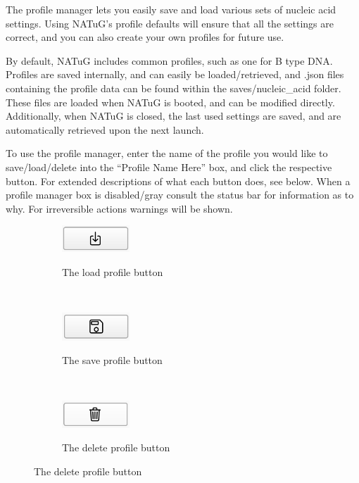 \documentclass[titlepage]{article}
\begin{document}
	The profile manager lets you easily save and load various sets of nucleic acid settings. Using NATuG’s profile defaults will ensure that all the settings are correct, and you can also create your own profiles for future use.
	
	By default, NATuG includes common profiles, such as one for B type DNA. Profiles are saved internally, and can easily be loaded/retrieved, and .json files containing the profile data can be found within the saves/nucleic\_acid folder. These files are loaded when NATuG is booted, and can be modified directly. Additionally, when NATuG is closed, the last used settings are saved, and are automatically retrieved upon the next launch.
	
	To use the profile manager, enter the name of the profile you would like to save/load/delete into the “Profile Name Here” box, and click the respective button. For extended descriptions of what each button does, see below. When a profile manager box is disabled/gray consult the status bar for information as to why. For irreversible actions warnings will be shown.
	
	\begin{figure}[h]
		\caption{Various Profile Actions}
		
		\centering
		\begin{subfigure}{.3\textwidth}
			\centering
			\caption{The load profile button}
			\includegraphics[width=1in]{load-profile-button.png}
			\label{fig:load-profile-button}
		\end{subfigure}%
		~
		\begin{subfigure}{.3\textwidth}
			\centering
			\caption{The save profile button}
			\includegraphics[width=1in]{save-profile-button.png}
			\label{fig:save-profile-button}
		\end{subfigure}%
		~
		\begin{subfigure}{.3\textwidth}
			\centering
			\caption{The delete profile button}
			\includegraphics[width=1in]{delete-profile-button.png}
			\label{fig:delete-profile-button}
		\end{subfigure}
	\end{figure}
	
\end{document}
